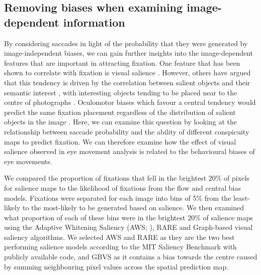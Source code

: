 \subsection{Removing biases when examining image-dependent information}

By considering saccades in light of the probability that they were generated by image-independent biases, we can gain further insights into the image-dependent features that are important in attracting fixation. One feature that has been shown to correlate with fixation is visual salience \citep{parkhurst2002}. However, others have argued that this tendency is driven by the correlation between salient objects and their semantic interest \citep{henderson2007}, with interesting objects tending to be placed near to the centre of photographs \citep{tatler2007}. Oculomotor biases which favour a central tendency would predict the same fixation placement regardless of the distribution of salient objects in the image \citep{tatler-vincent2009}. Here, we can examine this question by looking at the relationship between saccade probability and the ability of different conspicuity maps to predict fixation. We can therefore examine how the effect of visual salience observed in eye movement analysis is related to the behavioural biases of eye movements.

We compared the proportion of fixations that fell in the brightest 20\% of pixels for salience maps to the likelihood of fixations from the flow and central bias models. Fixations were separated for each image into bins of 5\% from the least-likely to the most-likely to be generated based on salience. We then examined what proportion of each of these bins were in the brightest 20\% of salience maps using the Adaptive Whitening Saliency (AWS; \cite{garciadiaz2012}), RARE \citep{riche2013} and Graph-based visual saliency \citep[GBVS;][]{harel2006} algorithms. We selected AWS and RARE as they are the two best performing salience models according to the MIT Saliency Benchmark \citep{mit-saliency-benchmark,judd2012} with publicly available code, and GBVS as it contains a bias towards the centre caused by summing neighbouring pixel values across the spatial prediction map.

